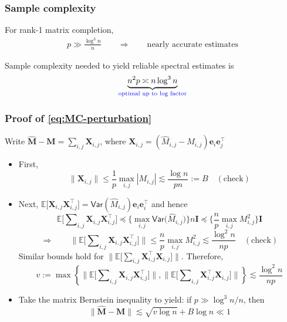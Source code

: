\documentclass[compress,
mathserif,wide,%
]{beamer}
\begin{document}
\begin{frame}
\frametitle{Sample complexity}

For rank-1 matrix completion, 
%
\begin{align*}
	p\gg \frac{\log^{3}n}{n}  \qquad \Longrightarrow \qquad \text{nearly accurate estimates}
\end{align*}


\vfill

Sample complexity needed to yield reliable spectral estimates is 
%
\[
	\underset{\textcolor{blue}{ \text{optimal up to log factor}}}{\underbrace{ n^2 p \asymp n \log ^3 n  }} 
\]
%

\end{frame}




\begin{frame}
	\frametitle{Proof of \eqref{eq:MC-perturbation}}

{\small


Write $\hat{\bm{M}}-\bm{M}=\sum_{i,j}\bm{X}_{i,j}$, where $\bm{X}_{i,j}=(\hat{M}_{i,j}-M_{i,j})\bm{e}_{i}\bm{e}_{j}^{\top}$
\begin{itemize}

\item First, 
\[
	\|\bm{X}_{i,j}\|\leq\frac{1}{p}\max_{i,j} |M_{i,j}| \lesssim\frac{\log n}{pn}:=B \quad (\text{check})
\]


\item Next, $\mathbb{E}\big[\bm{X}_{i,j}\bm{X}_{i,j}^{\top}\big]=\mathsf{Var}(\hat{M}_{i,j})\bm{e}_{i}\bm{e}_{i}^{\top}$
and hence
\[
\mathbb{E}\big[\sum\nolimits _{i,j}\bm{X}_{i,j}\bm{X}_{i,j}^{\top}\big]\preceq\Big\{\max_{i,j}\mathsf{Var}\big(\hat{M}_{i,j}\big)\Big\} n\bm{I}\preceq\Big\{\frac{n}{p}\max_{i,j}M_{i,j}^{2}\Big\}\bm{I}
\]
\[
\Longrightarrow\qquad\big\|\mathbb{E}\big[\sum\nolimits _{i,j}\bm{X}_{i,j}\bm{X}_{i,j}^{\top}\big]\big\|\leq\frac{n}{p}\max_{i,j}M_{i,j}^{2}\lesssim\frac{\log^{2}n}{np}\quad(\text{check})
\]
Similar bounds hold for $\big\|\mathbb{E}\big[\sum\nolimits _{i,j}\bm{X}_{i,j}^{\top}\bm{X}_{i,j}\big]\big\|$.
Therefore, 
\[
v:=\max\left\{ \big\|\mathbb{E}\big[\sum\nolimits _{i,j}\bm{X}_{i,j}\bm{X}_{i,j}^{\top}\big]\big\|,\big\|\mathbb{E}\big[\sum\nolimits _{i,j}\bm{X}_{i,j}^{\top}\bm{X}_{i,j}\big]\big\|\right\} \lesssim\frac{\log^{2}n}{np}
\]

\item Take the matrix Bernstein inequality to yield: if $p\gg\log^{3}n/n$,
then
\[
\|\hat{\bm{M}}-\bm{M}\|\lesssim\sqrt{v\log n}+B\log n\ll1
\]
\end{itemize}



}

\end{frame}
\end{document}
